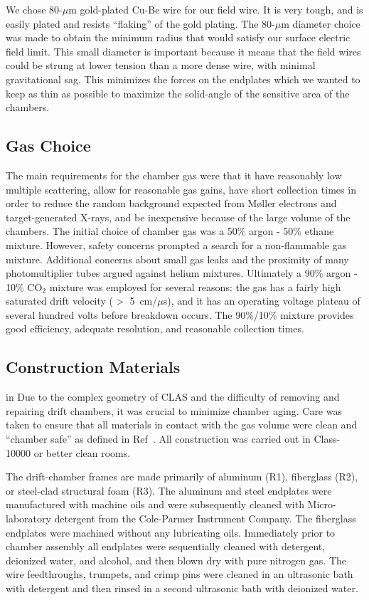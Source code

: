 We chose 80-$\mu$m gold-plated Cu-Be wire for our field wire.
It is very tough, and is easily plated and resists ``flaking'' of the gold
plating.  The 80-$\mu$m diameter choice was made to obtain the minimum
radius that would satisfy our surface electric field limit.  This small
diameter is important because it means that the field wires could be strung 
at lower tension than a more dense wire, with minimal gravitational sag.  
This minimizes the forces on the endplates which we wanted to keep as 
thin as possible to maximize the solid-angle of the sensitive area of
the chambers.

\subsection{Gas Choice}
\hskip 0.15in

The main requirements for the chamber gas were that it have reasonably low 
multiple scattering, allow for reasonable gas gains, have short collection 
times in order to reduce the random background expected from M{\o}ller 
electrons and target-generated X-rays, and be inexpensive because of the 
large volume of the chambers.  The initial choice of chamber gas was a
50$\%$ argon - 50$\%$ ethane mixture.  However, safety concerns prompted a 
search for a non-flammable gas mixture.  Additional concerns about small gas 
leaks and the proximity of many photomultiplier tubes argued against helium 
mixtures.  Ultimately a 90$\%$ argon - 10$\%$ CO$_2$ mixture was employed 
for several reasons: the gas has a fairly high saturated drift velocity 
($>$ 5~cm/$\mu$s), and it has an operating voltage plateau of several hundred 
volts before breakdown occurs.  The 90$\%$/10$\%$ mixture 
provides good efficiency, adequate resolution, and reasonable collection times.

\subsection{Construction Materials}

 in
Due to the complex geometry of CLAS and the difficulty of removing and repairing 
drift chambers, it was crucial to minimize chamber aging.  Care was taken to 
ensure that all materials in contact with the gas volume were clean and ``chamber 
safe'' as defined in Ref~\cite{kadyk}.  All construction was carried out in 
Class-10000 or better clean rooms.

The drift-chamber frames are made primarily of aluminum (R1), fiberglass (R2),
or steel-clad structural foam (R3).  The aluminum and steel endplates were 
manufactured with machine oils and were subsequently cleaned with  
Micro-laboratory detergent from the Cole-Parmer Instrument Company.  The 
fiberglass endplates were machined without any lubricating oils.  Immediately 
prior to chamber assembly all endplates were sequentially cleaned with detergent,
 deionized water, and alcohol, and then blown dry with pure nitrogen gas.  The 
wire feedthroughs, trumpets, and crimp pins were cleaned in an ultrasonic bath 
with detergent and then rinsed in a second ultrasonic bath with deionized water.

